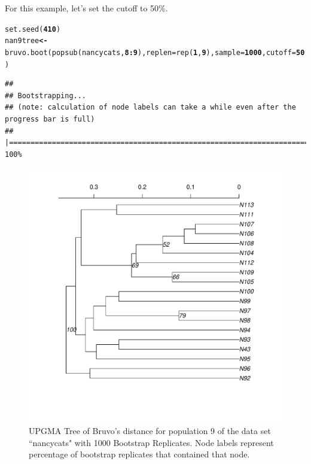 \documentclass[letterpaper]{article}\usepackage[]{graphicx}\usepackage[]{color}
\makeatletter
\newcommand{\hlnum}[1]{\textcolor[rgb]{0.502,0,0.502}{\textbf{#1}}}%
\newcommand{\hlopt}[1]{\textcolor[rgb]{1,0,0.502}{\textbf{#1}}}%
\newcommand{\hlstd}[1]{\textcolor[rgb]{0,0,0}{#1}}%
\newcommand{\hlkwb}[1]{\textcolor[rgb]{0.502,0.502,0.753}{\textbf{#1}}}%
\newcommand{\hlkwc}[1]{\textcolor[rgb]{0,0.502,0.753}{#1}}%
\newcommand{\hlkwd}[1]{\textcolor[rgb]{0,0.267,0.4}{#1}}%
\newenvironment{kframe}{%
 \def\at@end@of@kframe{}%
 \ifinner\ifhmode%
  \def\at@end@of@kframe{\end{minipage}}%
  \begin{minipage}{\columnwidth}%
 \fi\fi%
 \def\FrameCommand##1{\hskip\@totalleftmargin \hskip-\fboxsep
 \colorbox{shadecolor}{##1}\hskip-\fboxsep
     \hskip-\linewidth \hskip-\@totalleftmargin \hskip\columnwidth}%
 \MakeFramed {\advance\hsize-\width
   \@totalleftmargin\z@ \linewidth\hsize
   \@setminipage}}%
 {\par\unskip\endMakeFramed%
 \at@end@of@kframe}
\newenvironment{knitrout}{}{} %
\makeatother
\begin{document}
For this example, let's set the cutoff to 50\%.
\begin{knitrout}\footnotesize
{}\color{fgcolor}\begin{kframe}
\begin{alltt}
\hlkwd{set.seed}\hlstd{(}\hlnum{410}\hlstd{)}
\hlstd{nan9tree} \hlkwb{<-} \hlkwd{bruvo.boot}\hlstd{(}\hlkwd{popsub}\hlstd{(nancycats,} \hlnum{8}\hlopt{:}\hlnum{9}\hlstd{),} \hlkwc{replen} \hlstd{=} \hlkwd{rep}\hlstd{(}\hlnum{1}\hlstd{,} \hlnum{9}\hlstd{),} \hlkwc{sample} \hlstd{=} \hlnum{1000}\hlstd{,} \hlkwc{cutoff} \hlstd{=} \hlnum{50}\hlstd{)}
\end{alltt}
\end{kframe}
\end{knitrout}

\begin{knitrout}\footnotesize
{}\color{fgcolor}\begin{kframe}
\begin{verbatim}
## 
## Bootstrapping...
## (note: calculation of node labels can take a while even after the progress bar is full)
## |================================================================================| 100%
\end{verbatim}
\end{kframe}
\end{knitrout}

\begin{figure}[h!]
  \centering
  \caption{\footnotesize UPGMA Tree of Bruvo's distance for population 9 of the data set ``nancycats" with 1000 Bootstrap Replicates. Node labels represent percentage of bootstrap replicates that contained that node.}
  \label{bruvo_upgma}

\begin{knitrout}\footnotesize
{}\color{fgcolor}

{\centering \includegraphics[width=0.5\linewidth]{figure/bruvo_tree} 

}



\end{knitrout}


\end{figure}
\newpage
\end{document}
